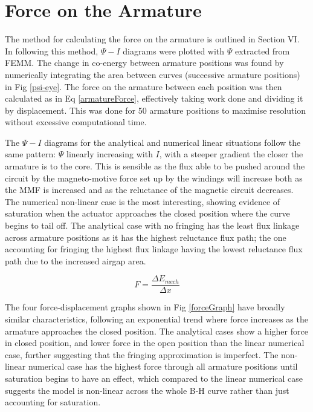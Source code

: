 \documentclass[a4paper]{IEEEtran}
\begin{document}
\section{Force on the Armature}

    The method for calculating the force on the armature is outlined in \cite{labPartB} Section VI. In following this method, \(\Psi-I\) diagrams were plotted with \(\Psi\) extracted from FEMM. The change in co-energy between armature positions was found by numerically integrating the area between curves (successive armature positions) in Fig \ref{psi-eye}. The force on the armature between each position was then calculated as in Eq \ref{armatureForce}, effectively taking work done and dividing it by displacement. This was done for 50 armature positions to maximise resolution without excessive computational time.

    The \(\Psi - I\) diagrams for the analytical and numerical linear situations follow the same pattern: \(\Psi\) linearly increasing with \(I\), with a steeper gradient the closer the armature is to the core. This is sensible as the flux able to be pushed around the circuit by the magneto-motive force set up by the windings will increase both as the MMF is increased and as the reluctance of the magnetic circuit decreases. The numerical non-linear case is the most interesting, showing evidence of saturation when the actuator approaches the closed position where the curve begins to tail off. The analytical case with no fringing has the least flux linkage across armature positions as it has the highest reluctance flux path; the one accounting for fringing the highest flux linkage having the lowest reluctance flux path due to the increased airgap area.  

    

    \begin{equation}
        F = \frac{\Delta E_{mech}}{\Delta x}
        \label{armatureForce}
    \end{equation}

    The four force-displacement graphs shown in Fig \ref{forceGraph} have broadly similar characteristics, following an exponential trend where force increases as the armature approaches the closed position. The analytical cases show a higher force in closed position, and lower force in the open position than the linear numerical case, further suggesting that the fringing approximation is imperfect. The non-linear numerical case has the highest force through all armature positions until saturation begins to have an effect, which compared to the linear numerical case suggests the model is non-linear across the whole B-H curve rather than just accounting for saturation. 
\end{document}
